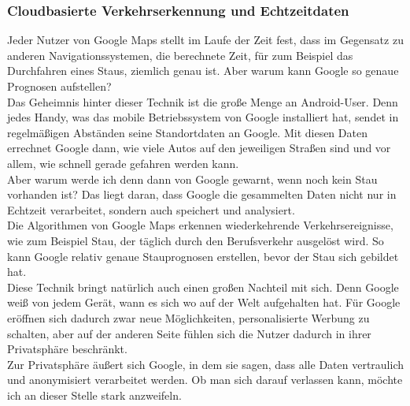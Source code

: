 \documentclass[12pt]{article}
\begin{document}
		\subsubsection{Cloudbasierte Verkehrserkennung und Echtzeitdaten}
			Jeder Nutzer von Google Maps stellt im Laufe der Zeit fest, dass im Gegensatz zu anderen Navigationssystemen, die berechnete Zeit, für zum Beispiel das Durchfahren eines Staus, ziemlich genau ist. Aber warum kann Google so genaue Prognosen aufstellen?\\
			Das Geheimnis hinter dieser Technik ist die große Menge an Android-User. Denn jedes Handy, was das mobile Betriebssystem von Google installiert hat, sendet in regelmäßigen Abständen seine Standortdaten an Google. Mit diesen Daten errechnet Google dann, wie viele Autos auf den jeweiligen Straßen sind und vor allem, wie schnell gerade gefahren werden kann.\\
			Aber warum werde ich denn dann von Google gewarnt, wenn noch kein Stau vorhanden ist? Das liegt daran, dass Google die gesammelten Daten nicht nur in Echtzeit verarbeitet, sondern auch speichert und analysiert.\\
			Die Algorithmen von Google Maps erkennen wiederkehrende Verkehrsereignisse, wie zum Beispiel Stau, der täglich durch den Berufsverkehr ausgelöst wird. So kann Google relativ genaue Stauprognosen erstellen, bevor der Stau sich gebildet hat.\\
			Diese Technik bringt natürlich auch einen großen Nachteil mit sich. Denn Google weiß von jedem Gerät, wann es sich wo auf der Welt aufgehalten hat. Für Google eröffnen sich dadurch zwar neue Möglichkeiten, personalisierte Werbung zu schalten, aber auf der anderen Seite fühlen sich die Nutzer dadurch in ihrer Privatsphäre beschränkt.\\
			Zur Privatsphäre äußert sich Google, in dem sie sagen, dass alle Daten vertraulich und anonymisiert verarbeitet werden. Ob man sich darauf verlassen kann, möchte ich an dieser Stelle stark anzweifeln. \cite{staumelder}
			
\end{document}
